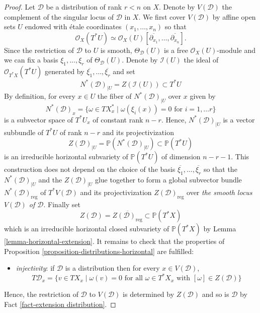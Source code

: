 \documentclass[12pt]{amsart}
\renewcommand{\P}{\mathbb{P}}
\theoremstyle{definition}
\theoremstyle{plain}
\theoremstyle{exampstyle}
\theoremstyle{exampstyle}\newtheorem{thmxbis}{Theorem}
\numberwithin{equation}{section}
\theoremstyle{remark}
\begin{document}
\begin{proof}
Let $\mathcal D$ be a distribution of rank $r < n$ on $X$. Denote by $V(\mathcal D)$ the complement of the singular locus of $\mathcal D$ in $X$. We first cover $V(\mathcal D)$ by affine open sets $U$ endowed with étale coordinates $(x_1,\ldots, x_n)$ so that 
$$\mathcal O_X(T^\ast U) \simeq \mathcal O_X(U)[\overline{\partial_{x_1}}, \ldots, \overline{\partial_{x_n}}].$$
Since the restriction of $\mathcal D$ to $U$ is smooth, $\Theta_\mathcal D(U)$ is a free $\mathcal O_X(U)$-module and we can fix a basis $\xi_1,\ldots, \xi_r$ of $\Theta_\mathcal D(U)$. Denote by $\mathcal I(U)$ the ideal of  $\mathcal O_{T^\ast X}(T^\ast U)$ generated by $\overline{\xi_1},\ldots, \overline{\xi_r}$ and set 
$$N^\ast(\mathcal D)_{\mid U} = Z(\mathcal I(U)) \subset T^\ast U  $$
By definition, for every $x \in U$ the fiber of 
$N^\ast(\mathcal D)_{\mid U}$ over $x$ given by 
$$N^\ast(\mathcal D)_x = \lbrace \omega \in TX^\ast_{x} \mid \omega(\xi_i(x)) = 0 \text{ for } i = 1,\ldots r \rbrace $$ 
is a subvector space of $T^\ast U_x$ of constant rank $n-r$.  Hence, $N^\ast(\mathcal D)_{\mid U}$ is a vector subbundle of $T^\ast U$ of rank $n-r$ and its projectivization
$$Z(\mathcal D)_{\mid U} = \P(N^\ast(\mathcal D)_{\mid U}) \subset  \P(T^\ast U)$$
is an irreducible horizontal subvariety of $\P(T^\ast U)$ of dimension $n - r - 1$. This construction does not depend on the choice of the basis $\overline{\xi_1},\ldots, \overline{\xi_r}$ so that the $N^\ast(\mathcal D)_{\mid U}$ and the $Z(\mathcal D)_{\mid U}$ glue together to form a global subvector bundle $N^\ast(\mathcal D)_{\mathrm{reg}}$ of $T^\ast V(\mathcal D)$ and its projectivization $Z(\mathcal D)_{\mathrm{reg}}$ over {\em the smooth locus $V(\mathcal D)$ of $\mathcal D$}. Finally set 
$$ Z(\mathcal D) = \overline{Z(\mathcal D)_{\mathrm{reg}}} \subset \P(T^\ast X)$$
which is an irreducible horizontal closed subvariety of $\P(T^\ast X)$ by Lemma \ref{lemma-horizontal-extension}. It remains to check that the properties of Proposition \ref{proposition-distributions-horizontal} are fulfilled: 
\begin{itemize} 
\item \textit{injectivity}: if $\mathcal D$ is a distribution then for every $x \in V(\mathcal D)$,
$$ T\mathcal D_x = \lbrace v \in TX_x \mid \omega(v) = 0 \text{ for all } \omega \in T^\ast X_x \text{  with }  [\omega] \in Z(\mathcal D)\rbrace$$
\end{itemize} 
Hence, the restriction of $\mathcal D$ to $V(\mathcal D)$ is determined by $Z(\mathcal D)$ and so is $\mathcal D$ by Fact \ref{fact-extension distribution}. 


\end{proof}
\end{document}
